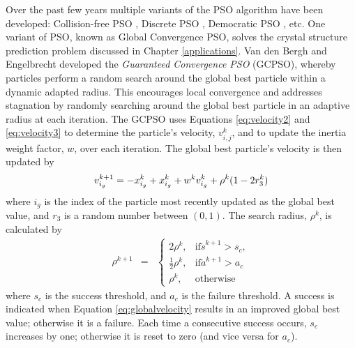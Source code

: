 Over the past few years multiple variants of the PSO algorithm have been developed: Collision-free PSO \cite{}, Discrete PSO \cite{}, Democratic PSO \cite{}, etc. One variant of PSO, known as Global Convergence PSO, solves the crystal structure prediction problem discussed in Chapter \ref{applications}. Van den Bergh and Engelbrecht \cite{} developed the \textit{Guaranteed Convergence PSO} (GCPSO), whereby particles perform a random search around the global best particle within a dynamic adapted radius.
This encourages local convergence and addresses stagnation by randomly searching around the global best particle in an adaptive radius at each iteration. The GCPSO uses Equations \ref{eq:velocity2} and \ref{eq:velocity3} to determine the particle's velocity, $v^k_{i,j}$, and to update the inertia weight factor, $w$, over each iteration. The global best particle's velocity is then updated by
\begin{equation}
    \label{eq:globalvelocity}
    v^{k+1}_{i_g} = -x^k_{i_g} + x^k_{i_g} + w^k v^k_{i_g} + \rho^k(1-2r^k_3) \\
\end{equation}
where $i_g$ is the index of the particle most recently updated as the global best value, and $r_3$ is a random number between $(0,1)$. The search radius, $\rho^k$, is calculated by
\begin{eqnarray}
    \rho^{k+1} & = &
    \begin{cases}
        2\rho^k, &\text{if} \check{s}^{k+1} > s_c,\\
        \frac{1}{2}\rho^k, &\text{if} \check{a}^{k+1}>a_c\\
        \rho^k, & \mbox{otherwise}
    \end{cases}
    \label{eq:rho}
\end{eqnarray}
where $s_c$ is the success threshold, and $a_c$ is the failure threshold. A success is indicated when Equation \ref{eq:globalvelocity} results in an improved global best value; otherwise it is a failure. Each time a consecutive success occurs, $s_c$ increases by one; otherwise it is reset to zero (and vice versa for $a_c$). 

    

